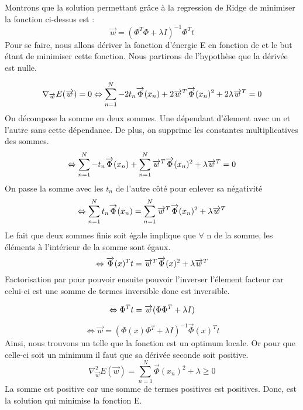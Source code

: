 \documentclass{article}
\begin{document}
Montrons que la solution permettant grâce à la regression de Ridge de minimiser la fonction ci-dessus est :
\[ \overrightarrow{w} = (\Phi^T \Phi + \lambda I)^{-1} \Phi^T t\]
Pour se faire, nous allons dériver la fonction d'énergie E en fonction de  et le but étant de minimiser cette fonction. Nous partirons de l'hypothèse que la dérivée est nulle.

   
    \[
    \nabla_{\overrightarrow{w}}E(\overrightarrow{w}) =0 \Leftrightarrow \sum_{n=1}^{N} -2t_{n}\overrightarrow{\Phi}(x_{n}) + 2\overrightarrow{w}^T \overrightarrow{\Phi}(x_{n})^2 + 2\lambda \overrightarrow{w}^T  = 0 \\\]
    On décompose la somme en deux sommes. Une dépendant d'élement avec un  et l'autre sans cette dépendance. De plus, on supprime les constantes multiplicatives des sommes. 
  \[  \Leftrightarrow \sum_{n=1}^{N} -t_{n}\overrightarrow{\Phi}(x_{n}) + \sum_{n=1}^{N} \overrightarrow{w}^T \overrightarrow{\Phi}(x_{n})^2 + \lambda \overrightarrow{w}^T  = 0 \\
    \]
    On passe la somme avec les $t_{n} $ de l'autre côté pour enlever sa négativité
    \[
    \Leftrightarrow \sum_{n=1}^{N} t_{n}\overrightarrow{\Phi}(x_{n})  = \sum_{n=1}^{N} \overrightarrow{w}^T \overrightarrow{\Phi}(x_{n})^2 + \lambda \overrightarrow{w}^T   \\\]
    Le fait que deux sommes finis soit égale implique que $\forall$ n de la somme, les éléments à l'intérieur de la somme sont égaux.
   \[ 
    \Leftrightarrow \overrightarrow{\Phi}(x)^T t = \overrightarrow{w}^T \overrightarrow{\Phi}(x)^2 + \lambda \overrightarrow{w}^T \\
    \]  
    Factorisation par  pour pouvoir ensuite pouvoir l'inverser l'élement facteur car celui-ci est une somme de termes inversible donc est inversible.
    
    \[ 
    \Leftrightarrow \Phi^T t = \overrightarrow{w} (\Phi\Phi^T+ \lambda I) \\
    \] 
    
    \[ 
    \Leftrightarrow  \overrightarrow{w} = (\Phi(x)\Phi^T+ \lambda I)^{-1} \overrightarrow{\Phi}(x)^T t  
    \]  
    Ainsi, nous trouvons un  telle que la fonction est un optimum locale. Or pour que celle-ci soit un minimum il faut que sa dérivée seconde soit positive.
    \[\nabla^2_{\overrightarrow{w}}E(\overrightarrow{w})= \sum_{n=1}^{N} \overrightarrow{\Phi}(x_{n})^2 + \lambda \ge 0\]
    La somme est positive car une somme de termes positives est positives. Donc,  est la solution qui minimise la fonction E.    
\end{document}
